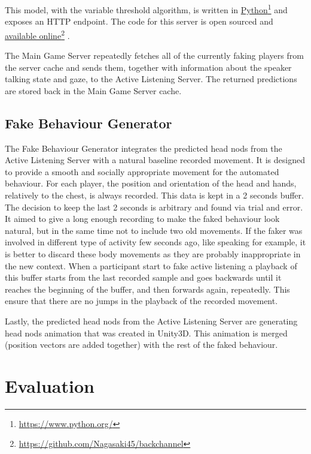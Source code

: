 \documentclass[]{simple-thesis}
\newcommand\fnurl[2]{%
  \href{#2}{#1}\footnote{\url{#2}}%
}
\begin{document}
This model, with the variable threshold algorithm, is written in \fnurl{Python}{https://www.python.org/} and exposes an HTTP endpoint.
The code for this server is open sourced and \fnurl{available online}{https://github.com/Nagasaki45/backchannel}.

The Main Game Server repeatedly fetches all of the currently faking players from the server cache and sends them, together with information about the speaker talking state and gaze, to the Active Listening Server.
The returned predictions are stored back in the Main Game Server cache.

\section{Fake Behaviour Generator}\label{system:fake_behaviour_generator}

The Fake Behaviour Generator integrates the predicted head nods from the Active Listening Server with a natural baseline recorded movement.
It is designed to provide a smooth and socially appropriate movement for the automated behaviour.
For each player, the position and orientation of the head and hands, relatively to the chest, is always recorded.
This data is kept in a 2 seconds buffer.
The decision to keep the last 2 seconds is arbitrary and found via trial and error.
It aimed to give a long enough recording to make the faked behaviour look natural, but in the same time not to include two old movements.
If the faker was involved in different type of activity few seconds ago, like speaking for example, it is better to discard these body movements as they are probably inappropriate in the new context.
When a participant start to fake active listening a playback of this buffer starts from the last recorded sample and goes backwards until it reaches the beginning of the buffer, and then forwards again, repeatedly.
This ensure that there are no jumps in the playback of the recorded movement.

Lastly, the predicted head nods from the Active Listening Server are generating head nods animation that was created in Unity3D.
This animation is merged (position vectors are added together) with the rest of the faked behaviour.


\chapter{Evaluation}\label{evaluation}
\end{document}
